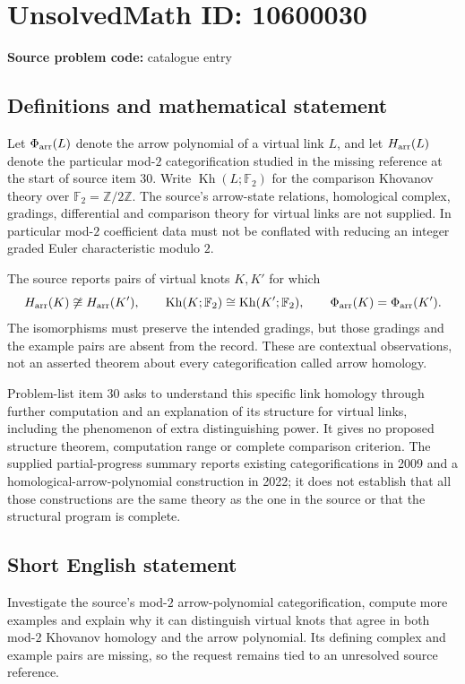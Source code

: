\documentclass[11pt]{article}
\newcommand{\Z}{\mathbb{Z}}
\newcommand{\F}{\mathbb{F}}
\begin{document}
\section*{UnsolvedMath ID: 10600030}
\textbf{Source problem code:} catalogue entry
\subsection{Definitions and mathematical statement}
Let \(\Phi_{\rm arr}(L)\) denote the arrow polynomial of a virtual link \(L\), and let \(H_{\rm arr}(L)\) denote the particular mod-\(2\) categorification studied in the missing reference at the start of source item 30. Write \(\operatorname{Kh}(L;\F_2)\) for the comparison Khovanov theory over \(\F_2=\Z/2\Z\). The source's arrow-state relations, homological complex, gradings, differential and comparison theory for virtual links are not supplied. In particular mod-\(2\) coefficient data must not be conflated with reducing an integer graded Euler characteristic modulo \(2\).

The source reports pairs of virtual knots \(K,K'\) for which
\[
 H_{\rm arr}(K)\not\cong H_{\rm arr}(K'),\qquad
 \operatorname{Kh}(K;\F_2)\cong\operatorname{Kh}(K';\F_2),\qquad
 \Phi_{\rm arr}(K)=\Phi_{\rm arr}(K').
\]
The isomorphisms must preserve the intended gradings, but those gradings and the example pairs are absent from the record. These are contextual observations, not an asserted theorem about every categorification called arrow homology.

Problem-list item 30 asks to understand this specific link homology through further computation and an explanation of its structure for virtual links, including the phenomenon of extra distinguishing power. It gives no proposed structure theorem, computation range or complete comparison criterion. The supplied partial-progress summary reports existing categorifications in 2009 and a homological-arrow-polynomial construction in 2022; it does not establish that all those constructions are the same theory as the one in the source or that the structural program is complete.
\subsection{Short English statement}
Investigate the source's mod-\(2\) arrow-polynomial categorification, compute more examples and explain why it can distinguish virtual knots that agree in both mod-\(2\) Khovanov homology and the arrow polynomial. Its defining complex and example pairs are missing, so the request remains tied to an unresolved source reference.
\end{document}
